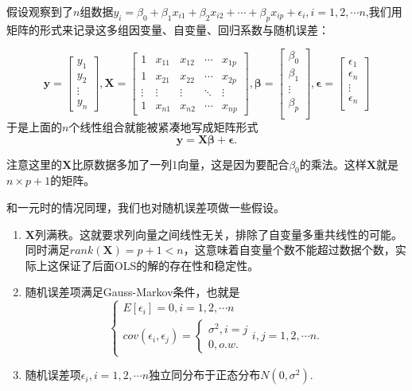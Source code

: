 \documentclass[lang=cn,10pt]{elegantbook}
\begin{document}
    假设观察到了\(n\)组数据\(y_i=\beta_0 + \beta_1x_{i1}+\beta_2x_{i2}+\cdots+\beta_px_{ip}+\epsilon_i,i=1,2,\cdots n\),我们用矩阵的形式来记录这多组因变量、自变量、回归系数与随机误差：

    \[\mathbf{y} =
    \begin{bmatrix}
        y_1\\
        y_2\\
        \vdots\\
        y_n
    \end{bmatrix}
    ,
    \mathbf{X} =
    \begin{bmatrix}
        1 & x_{11} & x_{12} & \cdots & x_{1p} \\
        1 & x_{21} & x_{22} & \cdots & x_{2p} \\
        \vdots & \vdots & \vdots & \ddots & \vdots \\
        1 & x_{n1} & x_{n2} & \cdots & x_{np}
    \end{bmatrix}
    ,
    \mathbf{\beta} =
    \begin{bmatrix}
        \beta_0\\
        \beta_1\\
        \vdots\\
        \beta_p\\
    \end{bmatrix}
    ,
    \mathbf{\epsilon} =
    \begin{bmatrix}
        \epsilon_1\\
        \epsilon_n\\
        \vdots\\
        \epsilon_n\\
    \end{bmatrix}
    \]
    于是上面的\(n\)个线性组合就能被紧凑地写成矩阵形式
    \[\mathbf{y}=\mathbf{X}\mathbf{\beta}+\mathbf{\epsilon}.\]
    \begin{note}
        注意这里的\(\mathbf{X}\)比原数据多加了一列1向量，这是因为要配合\(\beta_0\)的乘法。这样\(\mathbf{X}\)就是\(n\times p+1\)的矩阵。
    \end{note}
    和一元时的情况同理，我们也对随机误差项做一些假设。
    \begin{enumerate}
        \item \(\mathbf{X}\)列满秩。这就要求列向量之间线性无关，排除了自变量多重共线性的可能。同时满足\(rank(\mathbf{X})=p+1<n\)，这意味着自变量个数不能超过数据个数，实际上这保证了后面OLS的解的存在性和稳定性。
        \item 随机误差项满足Gauss-Markov条件，也就是\[\begin{cases}
            E[\epsilon_i]=0,i=1,2,\cdots n\\
            cov(\epsilon_i,\epsilon_j)=\begin{cases}
                \sigma^2,i=j\\
                0,o.w.
            \end{cases}
            i,j=1,2,\cdots n.
        \end{cases}\]
        \item 随机误差项\(\epsilon_i,i=1,2,\cdots n\)独立同分布于正态分布\(N(0,\sigma^2)\).
    \end{enumerate}
\end{document}

